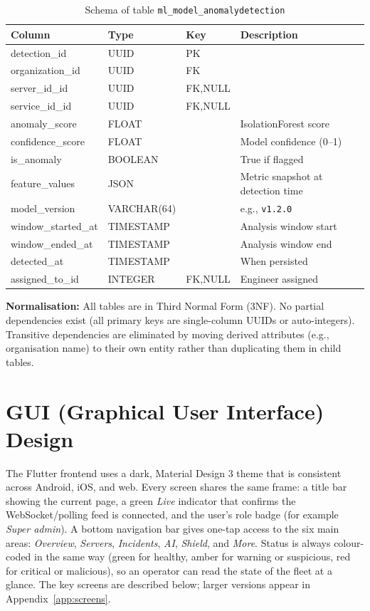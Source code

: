 \begin{table}[H]
\centering
\caption{Schema of table \texttt{ml\_model\_anomalydetection}}\label{tab:schema_anomaly}
\begin{tabularx}{\textwidth}{@{}l l l X@{}}
\toprule
\textbf{Column} & \textbf{Type} & \textbf{Key} & \textbf{Description}\\
\midrule
detection\_id    & UUID  & PK & \\
organization\_id & UUID  & FK & \\
server\_id\_id   & UUID  & FK,NULL & \\
service\_id\_id  & UUID  & FK,NULL & \\
anomaly\_score   & FLOAT & & IsolationForest score\\
confidence\_score & FLOAT & & Model confidence (0--1)\\
is\_anomaly      & BOOLEAN & & True if flagged\\
feature\_values  & JSON & & Metric snapshot at detection time\\
model\_version   & VARCHAR(64) & & e.g., \texttt{v1.2.0}\\
window\_started\_at & TIMESTAMP & & Analysis window start\\
window\_ended\_at   & TIMESTAMP & & Analysis window end\\
detected\_at     & TIMESTAMP & & When persisted\\
assigned\_to\_id & INTEGER & FK,NULL & Engineer assigned\\
\bottomrule
\end{tabularx}
\end{table}

\textbf{Normalisation:} All tables are in Third Normal Form (3NF).
No partial dependencies exist (all primary keys are single-column UUIDs or
auto-integers).  Transitive dependencies are eliminated by moving derived
attributes (e.g., organisation name) to their own entity rather than
duplicating them in child tables.

\section{GUI (Graphical User Interface) Design}\label{sec:gui}

The Flutter frontend uses a dark, Material Design 3 theme that is consistent
across Android, iOS, and web.  Every screen shares the same frame: a title bar
showing the current page, a green \textit{Live} indicator that confirms the
WebSocket/polling feed is connected, and the user's role badge (for example
\textit{Super admin}).  A bottom navigation bar gives one-tap access to the six
main areas: \textit{Overview}, \textit{Servers}, \textit{Incidents},
\textit{AI}, \textit{Shield}, and \textit{More}.  Status is always colour-coded
in the same way (green for healthy, amber for warning or suspicious, red for
critical or malicious), so an operator can read the state of the fleet at a
glance.  The key screens are described below; larger versions appear in
Appendix~\ref{app:screens}.

